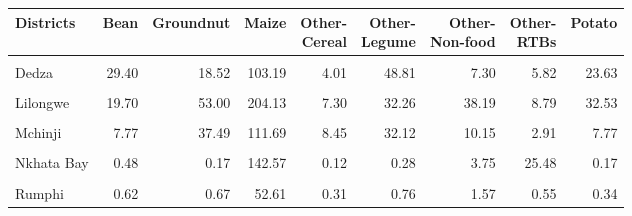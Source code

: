 \begin{table}[!h]
\centering\begingroup\fontsize{7}{9}\selectfont

\begin{tabular}{>{\raggedright\arraybackslash}p{1.8cm}rrrrrrrr}
\toprule
Districts & Bean & Groundnut & Maize & \makecell{Other-\\Cereal} & \makecell{Other-\\Legume} & \makecell{Other-\\Non-food} & \makecell{Other-\\RTBs} & Potato\\
\midrule
\cellcolor{gray!10}{Chitipa} & \cellcolor{gray!10}{6.05} & \cellcolor{gray!10}{4.73} & \cellcolor{gray!10}{46.09} & \cellcolor{gray!10}{1.22} & \cellcolor{gray!10}{7.25} & \cellcolor{gray!10}{10.64} & \cellcolor{gray!10}{5.47} & \cellcolor{gray!10}{5.50}\\
Dedza & 29.40 & 18.52 & 103.19 & 4.01 & 48.81 & 7.30 & 5.82 & 23.63\\
\cellcolor{gray!10}{Karonga} & \cellcolor{gray!10}{36.59} & \cellcolor{gray!10}{4.24} & \cellcolor{gray!10}{38.04} & \cellcolor{gray!10}{0.80} & \cellcolor{gray!10}{1.45} & \cellcolor{gray!10}{4.36} & \cellcolor{gray!10}{13.71} & \cellcolor{gray!10}{1.16}\\
Lilongwe & 19.70 & 53.00 & 204.13 & 7.30 & 32.26 & 38.19 & 8.79 & 32.53\\
\cellcolor{gray!10}{Mangochi} & \cellcolor{gray!10}{11.79} & \cellcolor{gray!10}{17.86} & \cellcolor{gray!10}{108.91} & \cellcolor{gray!10}{14.38} & \cellcolor{gray!10}{22.24} & \cellcolor{gray!10}{17.18} & \cellcolor{gray!10}{8.39} & \cellcolor{gray!10}{13.28}\\
\addlinespace
Mchinji & 7.77 & 37.49 & 111.69 & 8.45 & 32.12 & 10.15 & 2.91 & 7.77\\
\cellcolor{gray!10}{Mzimba} & \cellcolor{gray!10}{20.02} & \cellcolor{gray!10}{24.22} & \cellcolor{gray!10}{144.90} & \cellcolor{gray!10}{8.98} & \cellcolor{gray!10}{32.08} & \cellcolor{gray!10}{30.53} & \cellcolor{gray!10}{16.45} & \cellcolor{gray!10}{16.90}\\
Nkhata Bay & 0.48 & 0.17 & 142.57 & 0.12 & 0.28 & 3.75 & 25.48 & 0.17\\
\cellcolor{gray!10}{Nkhotakota} & \cellcolor{gray!10}{49.01} & \cellcolor{gray!10}{5.37} & \cellcolor{gray!10}{71.21} & \cellcolor{gray!10}{0.25} & \cellcolor{gray!10}{2.43} & \cellcolor{gray!10}{13.76} & \cellcolor{gray!10}{24.52} & \cellcolor{gray!10}{0.69}\\
Rumphi & 0.62 & 0.67 & 52.61 & 0.31 & 0.76 & 1.57 & 0.55 & 0.34\\
\bottomrule
\end{tabular}
\endgroup{}
\end{table}
